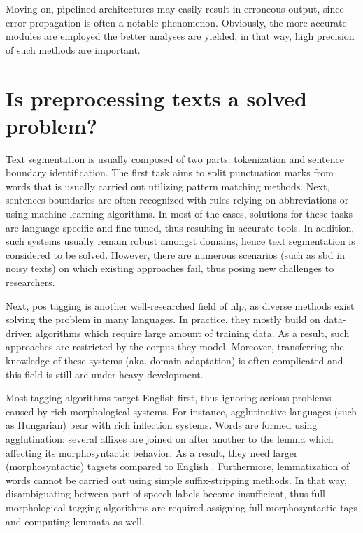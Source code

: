 Moving on, pipelined architectures may easily result in erroneous output, since error propagation is often a notable phenomenon. 
Obviously, the more accurate modules are employed the better analyses are yielded, in that way, high precision of such methods are important.

\section{Is preprocessing texts a solved problem?}



Text segmentation is usually composed of two parts: tokenization and sentence boundary identification. 
The first task aims to split punctuation marks from words that is usually carried out utilizing pattern matching methods.
Next, sentences boundaries are often recognized with rules relying on abbreviations or using machine learning algorithms.
In most of the cases, solutions for these tasks are language-specific and fine-tuned, thus resulting in accurate tools.
In addition, such systems usually remain robust amongst domains, hence text segmentation is considered to be solved.
However, there are numerous scenarios (such as \acrshort{sbd} in noisy texts) on which existing approaches fail, thus posing new challenges to researchers.

Next, \acrshort{pos} tagging is another well-researched field of \acrshort{nlp}, as diverse methods exist solving the problem in many languages. 
In practice, they mostly build on data-driven algorithms which require large amount of training data.
As a result, such approaches are restricted by the corpus they model.
Moreover, transferring the knowledge of these systems (aka. domain adaptation) is often complicated and this field is still are under heavy development.

Most tagging algorithms target English first, thus ignoring serious problems caused by rich morphological systems.
For instance, agglutinative languages (such as Hungarian) bear with rich inflection systems.
Words are formed using agglutination: several affixes are joined on after another to the lemma which affecting its morphosyntactic behavior.
As a result, they need larger (morphosyntactic) tagsets compared to English . 
Furthermore, lemmatization of words cannot be carried out using simple suffix-stripping methods.
In that way, disambiguating between part-of-speech labels become insufficient, thus full morphological tagging algorithms are required assigning full morphosyntactic tags and computing lemmata as well.

